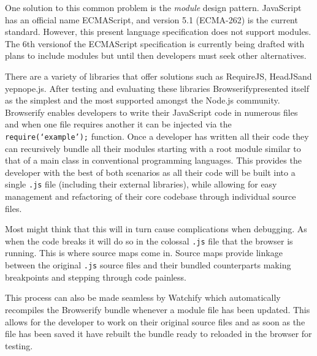 \documentclass[final]{cmpreport}
\begin{document}
One solution to this common problem is the \textit{module} design pattern. JavaScript has an official name ECMAScript, and version 5.1 (ECMA-262\footnotemark) is the current standard. However, this present language specification does not support modules. The 6th version\footnotemark of the ECMAScript specification is currently being drafted with plans to include modules but until then developers must seek other alternatives.


There are a variety of libraries that offer solutions such as RequireJS\footnotemark, HeadJS\footnotemark and yepnope.js\footnotemark. After testing and evaluating these libraries Browserify\footnotemark presented itself as the simplest and the most supported amongst the Node.js community. Browserify enables developers to write their JavaScript code in numerous files and when one file requires another it can be injected via the \texttt{require(`example');} function. Once a developer has written all their code they can recursively bundle all their modules starting with a root module similar to that of a main class in conventional programming languages. This provides the developer with the best of both scenarios as all their code will be built into a single \texttt{.js} file (including their external libraries), while allowing for easy management and refactoring of their core codebase through individual source files.


Most might think that this will in turn cause complications when debugging. As when the code breaks it will do so in the colossal \texttt{.js} file that the browser is running. This is where source maps come in. Source maps provide linkage between the original \texttt{.js} source files and their bundled counterparts making breakpoints and stepping through code painless. \cite{Seddon}

This process can also be made seamless by Watchify which automatically recompiles the Browserify bundle whenever a module file has been updated. This allows for the developer to work on their original source files and as soon as the file has been saved it have rebuilt the bundle ready to reloaded in the browser for testing.
\end{document}
